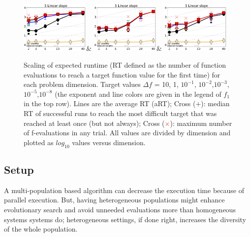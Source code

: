 \documentclass[review]{elsarticle}
\begin{document}
\begin{figure}[h!tb]
\begin{tabular}
  \includegraphics[width=0.30\textwidth]{GAOnly_f005}&
  \includegraphics[width=0.30\textwidth]{PSOOnly_f005}&
  \includegraphics[width=0.30\textwidth]{GAPSO_f005}\\
  \end{tabular}
  \vspace{-3ex}
   \caption{
Scaling of expected runtime (RT defined as the number of function
evaluations to reach a target function value for the first time) for  
each problem dimension. Target values $\Delta f$ = 10, 1, $10^{-1}$, $10^{-2}$,$10^{-3}$,$10^{-5}$,$10^{-8}$
(the exponent and line colors are given in the legend of $f_1$ in the top row). 
Lines are the average RT (aRT); Cross ($+$): median RT of successful runs to reach
the most difficult target that was reached at least once (but not always);
Cross (\textcolor{red}{$\times$}): maximum number of f-evaluations in any trial. 
All values are divided by dimension and plotted as $log_{10}$ values versus dimension.
}
\label{fig:bbob}
\end{figure}


\subsection{Setup}

A multi-population based algorithm can decrease the execution time
because of parallel execution. But, having heterogeneous 
populations might enhance evolutionary search and avoid unneeded
evaluations more than homogeneous systems systems do; heterogeneous settings, if
done right, increases the diversity of the whole population\cite{araujo2008multikulti}.
\end{document}
